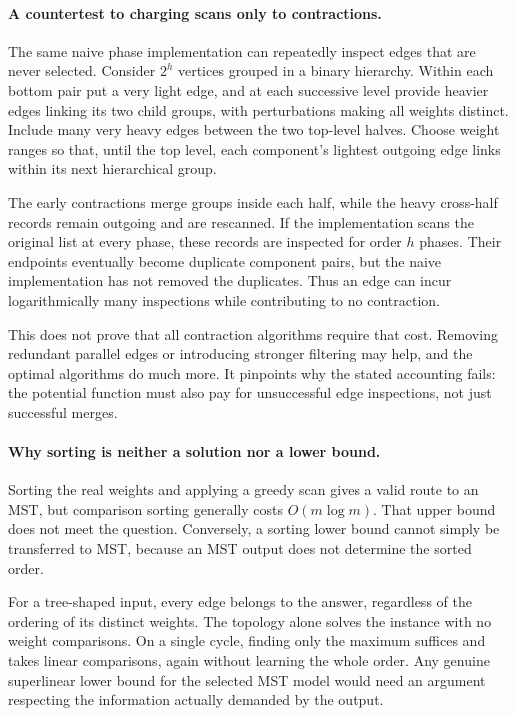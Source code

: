 \documentclass[11pt]{article}
\begin{document}
\paragraph{A countertest to charging scans only to contractions.}
The same naive phase implementation can repeatedly inspect edges that are never selected. Consider $2^h$ vertices grouped in a binary hierarchy. Within each bottom pair put a very light edge, and at each successive level provide heavier edges linking its two child groups, with perturbations making all weights distinct. Include many very heavy edges between the two top-level halves. Choose weight ranges so that, until the top level, each component's lightest outgoing edge links within its next hierarchical group.

The early contractions merge groups inside each half, while the heavy cross-half records remain outgoing and are rescanned. If the implementation scans the original list at every phase, these records are inspected for order $h$ phases. Their endpoints eventually become duplicate component pairs, but the naive implementation has not removed the duplicates. Thus an edge can incur logarithmically many inspections while contributing to no contraction.

This does not prove that all contraction algorithms require that cost. Removing redundant parallel edges or introducing stronger filtering may help, and the optimal algorithms do much more. It pinpoints why the stated accounting fails: the potential function must also pay for unsuccessful edge inspections, not just successful merges.

\paragraph{Why sorting is neither a solution nor a lower bound.}
Sorting the real weights and applying a greedy scan gives a valid route to an MST, but comparison sorting generally costs $O(m\log m)$. That upper bound does not meet the question. Conversely, a sorting lower bound cannot simply be transferred to MST, because an MST output does not determine the sorted order.

For a tree-shaped input, every edge belongs to the answer, regardless of the ordering of its distinct weights. The topology alone solves the instance with no weight comparisons. On a single cycle, finding only the maximum suffices and takes linear comparisons, again without learning the whole order. Any genuine superlinear lower bound for the selected MST model would need an argument respecting the information actually demanded by the output.
\end{document}
